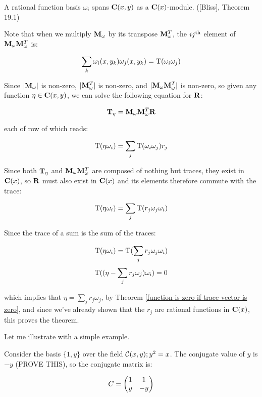 \endtheorem

\theorem
\label{|M| != 0 implies C(x) basis}

A rational function basis $\omega_i$ spans ${\bf C}(x,y)$ as
a ${\bf C}(x)$-module. ([Bliss], Theorem 19.1)

\proof

Note that when we multiply ${\bf M}_\omega$ by its transpose ${\bf
M}_\omega^T$, the $ij^{\rm th}$ element of ${\bf M}_\omega{\bf
M}_\omega^T$ is:

$$ \sum_k \omega_i(x, y_k)\omega_j(x, y_k) = {\rm T}(\omega_i \omega_j)$$

Since $|{\bf M}_\omega|$ is non-zero, $|{\bf M}_\omega^T|$ is
non-zero, and $|{\bf M}_\omega{\bf M}_\omega^T|$ is non-zero, so given
any function $\eta \in {\bf C}(x,y)$, we can solve the following
equation for ${\bf R}$:

$${\bf T}_\eta = {\bf M}_\omega {\bf M}_\omega^T {\bf R}$$

each of row of which reads:

$$ {\rm T}(\eta \omega_i) = \sum_j {\rm T}(\omega_i \omega_j) r_j $$

Since both ${\bf T}_\eta$ and ${\bf M}_\omega{\bf M}_\omega^T$ are composed of
nothing but traces, they exist in ${\bf C}(x)$, so ${\bf R}$ must also
exist in ${\bf C}(x)$ and its elements therefore commute with the
trace:

$$ {\rm T}(\eta \omega_i) = \sum_j {\rm T}(r_j \omega_j \omega_i) $$

Since the trace of a sum is the sum of the traces:

$$ {\rm T}(\eta \omega_i) = {\rm T}(\sum_j r_j \omega_j \omega_i) $$
$$ {\rm T}((\eta - \sum_j r_j \omega_j) \omega_i) = 0 $$

which implies that $\eta = \sum_j r_j \omega_j$, by Theorem
\ref{function is zero if trace vector is zero}, and since we've
already shown that the $r_j$ are rational functions in ${\bf C}(x)$,
this proves the theorem.

\endtheorem

Let me illustrate with a simple example.

\example

Consider the basis $\{1, y\}$ over the field ${\cal C}(x,y); y^2=x$.
The conjugate value of $y$ is $-y$ (PROVE THIS), so the conjugate
matrix is:

$$C=\left(\begin{matrix}1&1\cr y&-y\cr\end{matrix}\right)$$

